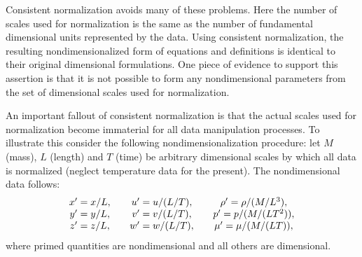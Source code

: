 Consistent normalization avoids many of these problems.  Here the
number of scales used for normalization is the same as the number
of fundamental dimensional units represented by the data.  Using
consistent normalization, the resulting nondimensionalized form of
equations and definitions is identical to their original dimensional
formulations.  One piece of evidence to support this assertion is that
it is not possible to form any nondimensional parameters from the set of
dimensional scales used for normalization.

An important fallout of consistent normalization is that the actual
scales used for normalization become immaterial for all data
manipulation processes.  To illustrate this consider the following
nondimensionalization procedure: let $M$ (mass), $L$ (length) and $T$
(time) be arbitrary dimensional scales by which all data is normalized
(neglect temperature data for the present).  The nondimensional data
follows:
$$
\begin{array}{c@{\qquad}c@{\qquad}c}
 x' = x/L, & u' = u/(L/T), & \rho' = \rho/(M/L^3), \\
 y' = y/L, & v' = v/(L/T), & p' = p/(M/(L T^2)), \\ 
 z' = z/L, & w' = w/(L/T), & \mu' = \mu/(M/(L T)), 
\end{array}
$$
where primed quantities are nondimensional and all others are dimensional.

